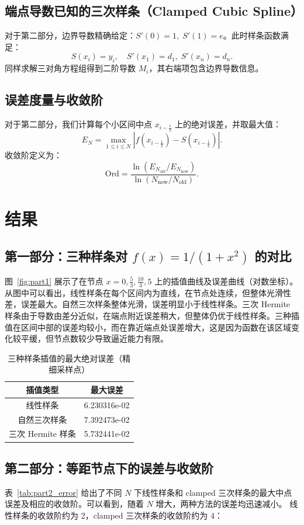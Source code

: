 \documentclass{article}
\begin{document}
\subsection{端点导数已知的三次样条（Clamped Cubic Spline）}
对于第二部分，边界导数精确给定：\(S'(0)=1,\;S'(1)=e\)。此时样条函数满足：
\[
S(x_i)=y_i,\quad S'(x_1)=d_1,\;S'(x_n)=d_n.
\]
同样求解三对角方程组得到二阶导数 \(M_i\)，其右端项包含边界导数信息。

\subsection{误差度量与收敛阶}
对于第二部分，我们计算每个小区间中点 \(x_{i-\frac12}\) 上的绝对误差，并取最大值：
\[
E_N=\max_{1\le i\le N}\left|f(x_{i-\frac12})-S(x_{i-\frac12})\right|.
\]
收敛阶定义为：
\[
\text{Ord}=\frac{\ln(E_{N_{\text{old}}}/E_{N_{\text{now}}})}{\ln(N_{\text{now}}/N_{\text{old}})}.
\]

\section{结果}
\subsection{第一部分：三种样条对 \(f(x)=1/(1+x^2)\) 的对比}
图~\ref{fig:part1} 展示了在节点 \(x=0,\frac{5}{3},\frac{10}{3},5\) 上的插值曲线及误差曲线（对数坐标）。从图中可以看出，线性样条在每个区间内为直线，在节点处连续，但整体光滑性差，误差最大。自然三次样条整体光滑，误差明显小于线性样条。三次 Hermite 样条由于导数由差分近似，在端点附近误差稍大，但整体仍优于线性样条。三种插值在区间中部的误差均较小，而在靠近端点处误差增大，这是因为函数在该区域变化较平缓，但节点数较少导致逼近能力有限。

\begin{table}[htb]
\centering
\caption{三种样条插值的最大绝对误差（精细采样点）}
\label{tab:part1_error}
\begin{tabular}{|c|c|}
\hline
插值类型 & 最大误差 \\
\hline
线性样条 & 6.230316e-02 \\
自然三次样条 & 7.392473e-02 \\
三次 Hermite 样条 & 5.732441e-02 \\
\hline
\end{tabular}
\end{table}

\subsection{第二部分：等距节点下的误差与收敛阶}
表~\ref{tab:part2_error} 给出了不同 \(N\) 下线性样条和 clamped 三次样条的最大中点误差及相应的收敛阶。可以看到，随着 \(N\) 增大，两种方法的误差均迅速减小。
线性样条的收敛阶约为 2，clamped 三次样条的收敛阶约为 4：
\end{document}
